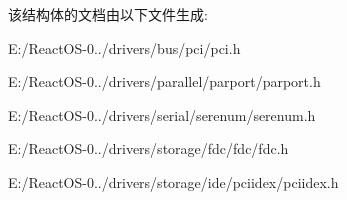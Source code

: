该结构体的文档由以下文件生成\+:\begin{DoxyCompactItemize}
\item 
E\+:/\+React\+O\+S-\/0../drivers/bus/pci/pci.\+h\item 
E\+:/\+React\+O\+S-\/0../drivers/parallel/parport/parport.\+h\item 
E\+:/\+React\+O\+S-\/0../drivers/serial/serenum/serenum.\+h\item 
E\+:/\+React\+O\+S-\/0../drivers/storage/fdc/fdc/fdc.\+h\item 
E\+:/\+React\+O\+S-\/0../drivers/storage/ide/pciidex/pciidex.\+h\end{DoxyCompactItemize}
